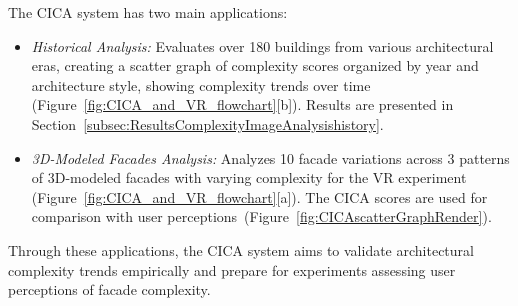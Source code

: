 The CICA system has two main applications:
\begin{itemize}
    \item \textit{Historical Analysis:} Evaluates over 180 buildings from various architectural eras, creating a scatter graph of complexity scores organized by year and architecture style, showing complexity trends over time (Figure~\ref{fig:CICA_and_VR_flowchart}[b]). Results are presented in Section~\ref{subsec:ResultsComplexityImageAnalysishistory}.

    \item \textit{3D-Modeled Facades Analysis:} Analyzes 10 facade variations across 3 patterns of 3D-modeled facades with varying complexity for the VR experiment (Figure~\ref{fig:CICA_and_VR_flowchart}[a]). The CICA scores are used for comparison with user perceptions~(Figure~\ref{fig:CICAscatterGraphRender}).
\end{itemize}

Through these applications, the CICA system aims to validate architectural complexity trends empirically and prepare for experiments assessing user perceptions of facade complexity.
